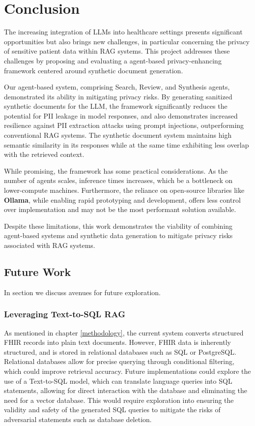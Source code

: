 \chapter{Conclusion} \label{conclusion}
The increasing integration of LLMs into healthcare settings presents significant opportunities but also brings new challenges, in particular concerning the privacy of sensitive patient data within RAG systems. This project addresses these challenges by proposing and evaluating a agent-based privacy-enhancing framework centered around synthetic document generation.

Our agent-based system, comprising Search, Review, and Synthesis agents, demonstrated its ability in mitigating privacy risks. By generating sanitized synthetic documents for the LLM, the framework significantly reduces the potential for PII leakage in model responses, and also demonstrates increased resilience against PII extraction attacks using prompt injections, outperforming conventional RAG systems. The synthetic document system maintains high semantic similarity in its responses while at the same time exhibiting less overlap with the retrieved context.

While promising, the framework has some practical considerations. As the number of agents scales, inference times increases, which be a bottleneck on lower-compute machines. Furthermore, the reliance on open-source libraries like \textbf{Ollama}, while enabling rapid prototyping and development, offers less control over implementation and may not be the most performant solution available.

Despite these limitations, this work demonstrates the viability of combining agent-based systems and synthetic data generation to mitigate privacy risks associated with RAG systems.

\section{Future Work}
In section we discuss avenues for future exploration.

\subsection{Leveraging Text-to-SQL RAG}
As mentioned in chapter \ref{methodology}, the current system converts structured FHIR records into plain text documents. However, FHIR data is inherently structured, and is stored in relational databases such as SQL or PostgreSQL. Relational databases allow for precise querying through conditional filtering, which could improve retrieval accuracy. Future implementations could explore the use of a Text-to-SQL model, which can translate language queries into SQL statements, allowing for direct interaction with the database and eliminating the need for a vector database. This would require exploration into ensuring the validity and safety of the generated SQL queries to mitigate the risks of adversarial statements such as database deletion.

